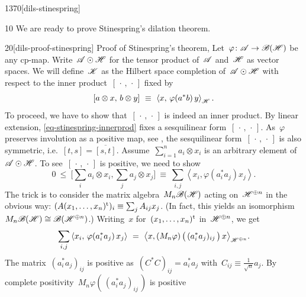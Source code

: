 \begin{parsec}{1370}[dils-stinespring]%
\begin{point}{10}%
We are ready to prove Stinespring's dilation theorem.
\begin{point}{20}[dils-proof-stinespring]{%
    Proof of Stinespring's theorem, }%
Let~$\varphi\colon \mathscr{A} \to \mathscr{B}(\mathscr{H})$
    be any cp-map.
Write~$\mathscr{A} \odot \mathscr{H}$ for the tensor product of~$\mathscr{A}$ and~$\mathscr{H}$
    as vector spaces.
We will define~$\mathscr{K}$ as the Hilbert space completion
    of~$\mathscr{A} \odot \mathscr{H}$ with respect to the inner
    product~$[\,\cdot\,,\,\cdot\,]$
    fixed by
\begin{equation}\label{eq-stinespring-innerprod}
    [a\otimes x,\, b \otimes y] \ \equiv\  \left<x, \,\varphi(a^*b)\, y\right>_{\mathscr{H}}.
\end{equation}
To proceed, we have to show that~$[\,\cdot\,,\,\cdot\,]$
    is indeed an inner product.
By linear extension, \eqref{eq-stinespring-innerprod}
    fixes a sesquilinear form~$[\,\cdot\,,\,\cdot\,]$.
As~$\varphi$ preserves involution as a positive map,
see ,
    the sesquilinear form~$[\,\cdot\,,\,\cdot\,]$
is also symmetric, i.e.~$[t,s]=\overline{[s,t]}$.
    Assume~$\sum^n_{i=1} a_i\otimes x_i$
is an arbitrary element of~$\mathscr{A} \odot \mathscr{H}$.
To see~$[\,\cdot\,,\,\cdot\,]$ is positive,
we need to show
\begin{equation*}
    0 \ \leq\  \bigl[\sum_i a_i\otimes x_i, \sum_j a_j\otimes x_j\bigr]
        \ \equiv\  \sum_{i,j} \left< x_i, \varphi(a_i^*a_j) x_j \right>.
\end{equation*}
The trick is to consider the matrix algebra~$M_n\mathscr{B}(\mathscr{H})$
acting on~$\mathscr{H}^{\oplus n}$ in the obvious way:
$(A (x_1,\ldots,x_n)^{\mathrm{t}})_i \equiv \sum_j A_{ij} x_j$.
(In fact, this yields an
    isomorphism~$M_n\mathscr{B}(\mathscr{H}) \cong \mathscr{B}(\mathscr{H}^{\oplus n})$.)
Writing~$x$ for~$(x_1,\ldots,x_n)^{\mathrm{t}}$ in~$\mathscr{H}^{\oplus n}$,
    we get
\begin{equation}\label{eq-stinespring-norm-tensor}
    \sum_{i,j} \left< x_i, \,\varphi(a_i^*a_j)\, x_j \right>
    \ =\  \bigl<
    x,
    (M_n\varphi) \,\bigl(\, (a_i^*a_j)_{ij} \, \bigr)\,
    x \bigr>_{\mathscr{H}^{\oplus n}}.
\end{equation}
The matrix~$(a_i^*a_j)_{ij}$
is positive as~$(C^*C)_{ij} = a_i^*a_j$
    with~$C_{ij} \equiv \frac{1}{\sqrt{n}} a_j$.
    By complete positivity~$M_n\varphi(\,(a_i^*a_j)_{ij}\,)$ is positive

\end{point}
\end{point}
\end{parsec}
